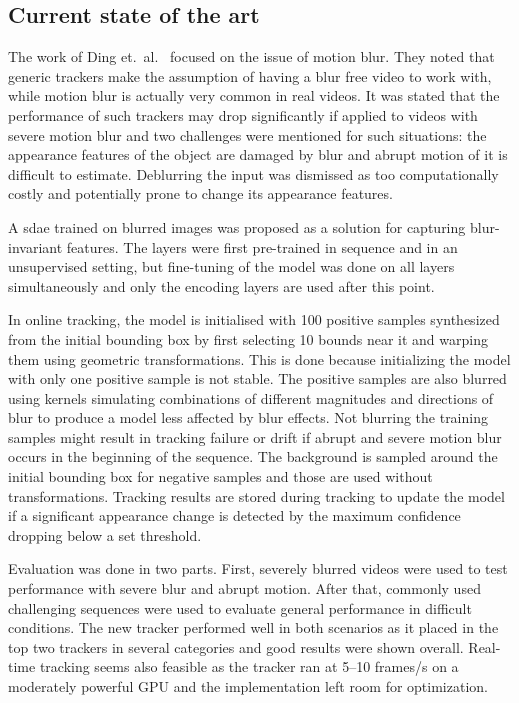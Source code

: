 \subsection{Current state of the art}

The work of Ding et.~al.~\cite{BLUR_TRACK} focused on the issue of motion blur.
They noted that generic trackers make the assumption of having a blur free video
to work with, while motion blur is actually very common in real videos. It was stated
that the performance of such trackers may drop significantly if applied to videos with
severe motion blur and two challenges were mentioned for such situations: the appearance
features of the object are damaged by blur and abrupt motion of it is difficult to
estimate. Deblurring the input was dismissed as too computationally costly and potentially
prone to change its appearance features.~\cite{BLUR_TRACK}

A \ac{sdae} trained on blurred images was proposed as a solution for capturing blur-invariant
features. The layers were first pre-trained in sequence and in an unsupervised setting,
but fine-tuning of the model was done on all layers simultaneously and only the encoding
layers are used after this point.~\cite{BLUR_TRACK}

In online tracking, the model is initialised with 100 positive samples synthesized from the
initial bounding box by first selecting 10 bounds near it and warping them using geometric
transformations. This is done because initializing the model with only one positive sample
is not stable. The positive samples are also blurred using kernels simulating combinations
of different magnitudes and directions of blur to produce a model less affected by blur
effects. Not blurring the training samples might result in tracking failure or drift if
abrupt and severe motion blur occurs in the beginning of the sequence. The background is
sampled around the initial bounding box for negative samples and those are used without
transformations. Tracking results are stored during tracking to update the model if a
significant appearance change is detected by the maximum confidence dropping below a set
threshold.~\cite{BLUR_TRACK}

Evaluation was done in two parts. First, severely blurred videos were used to test
performance with severe blur and abrupt motion. After that, commonly used challenging
sequences were used to evaluate general performance in difficult conditions. The new
tracker performed well in both scenarios as it placed in the top two trackers in several
categories and good results were shown overall. Real-time tracking seems also feasible
as the tracker ran at 5--10 frames/s on a moderately powerful GPU and the implementation
left room for optimization.

